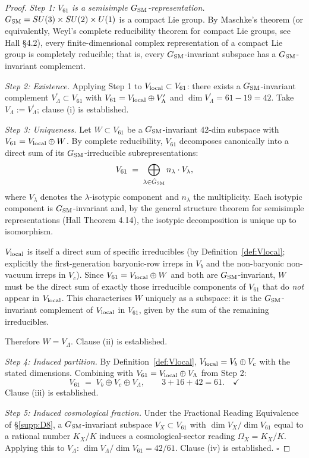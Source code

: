 \documentclass[11pt]{article}
\theoremstyle{plain}
\theoremstyle{definition}
\theoremstyle{remark}
\begin{document}
\begin{proof}
\emph{Step 1: $V_{61}$ is a semisimple $G_{\rm SM}$-representation.}  $G_{\rm SM} = SU(3) \times SU(2) \times U(1)$ is a compact Lie group.  By Maschke's theorem (or equivalently, Weyl's complete reducibility theorem for compact Lie groups, see Hall \cite{Hall2015} \S4.2), every finite-dimensional complex representation of a compact Lie group is completely reducible; that is, every $G_{\rm SM}$-invariant subspace has a $G_{\rm SM}$-invariant complement.

\emph{Step 2: Existence.}  Applying Step 1 to $V_{\rm local} \subset V_{61}$: there exists a $G_{\rm SM}$-invariant complement $V_\Lambda^\prime \subset V_{61}$ with $V_{61} = V_{\rm local} \oplus V_\Lambda^\prime$ and $\dim V_\Lambda^\prime = 61 - 19 = 42$.  Take $V_\Lambda := V_\Lambda^\prime$; clause (i) is established.

\emph{Step 3: Uniqueness.}  Let $W \subset V_{61}$ be a $G_{\rm SM}$-invariant 42-dim subspace with $V_{61} = V_{\rm local} \oplus W$.  By complete reducibility, $V_{61}$ decomposes canonically into a direct sum of its $G_{\rm SM}$-irreducible subrepresentations:
\[
  V_{61} \;=\; \bigoplus_{\lambda \in \hat{G}_{\rm SM}} n_\lambda \cdot V_\lambda,
\]
where $V_\lambda$ denotes the $\lambda$-isotypic component and $n_\lambda$ the multiplicity.  Each isotypic component is $G_{\rm SM}$-invariant and, by the general structure theorem for semisimple representations (Hall \cite{Hall2015} Theorem 4.14), the isotypic decomposition is unique up to isomorphism.

$V_{\rm local}$ is itself a direct sum of specific irreducibles (by Definition~\ref{def:Vlocal}; explicitly the first-generation baryonic-row irreps in $V_b$ and the non-baryonic non-vacuum irreps in $V_c$).  Since $V_{61} = V_{\rm local} \oplus W$ and both are $G_{\rm SM}$-invariant, $W$ must be the direct sum of exactly those irreducible components of $V_{61}$ that do \emph{not} appear in $V_{\rm local}$.  This characterises $W$ uniquely as a subspace: it is the $G_{\rm SM}$-invariant complement of $V_{\rm local}$ in $V_{61}$, given by the sum of the remaining irreducibles.

Therefore $W = V_\Lambda$.  Clause (ii) is established.

\emph{Step 4: Induced partition.}  By Definition~\ref{def:Vlocal}, $V_{\rm local} = V_b \oplus V_c$ with the stated dimensions.  Combining with $V_{61} = V_{\rm local} \oplus V_\Lambda$ from Step 2:
\[
  V_{61} \;=\; V_b \oplus V_c \oplus V_\Lambda,
  \qquad 3 + 16 + 42 = 61. \quad\checkmark
\]
Clause (iii) is established.

\emph{Step 5: Induced cosmological fraction.}  Under the Fractional Reading Equivalence of \S\ref{supp:D8}, a $G_{\rm SM}$-invariant subspace $V_X \subset V_{61}$ with $\dim V_X / \dim V_{61}$ equal to a rational number $K_X / K$ induces a cosmological-sector reading $\Omega_X = K_X / K$.  Applying this to $V_\Lambda$: $\dim V_\Lambda / \dim V_{61} = 42/61$.  Clause (iv) is established. $\square$
\end{proof}
\end{document}
